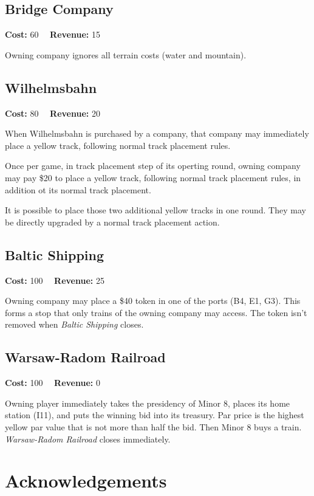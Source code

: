 \documentclass[10pt,a4paper,twocolumn]{article}
\begin{document}
\subsection{Bridge Company}

\textbf{Cost:} 60 ~~\textbf{Revenue:} 15

Owning company ignores all terrain costs (water and mountain).

\subsection{Wilhelmsbahn}

\textbf{Cost:} 80 ~~\textbf{Revenue:} 20

When Wilhelmsbahn is purchased by a company, that company may immediately place a yellow track, following normal track placement rules.

Once per game, in track placement step of its operting round, owning company may pay \$20 to place a yellow track, following normal track placement rules, in addition ot its normal track placement. 

It is possible to place those two additional yellow tracks in one round. They may be directly upgraded by a normal track placement action.

\subsection{Baltic Shipping}

\textbf{Cost:} 100 ~~\textbf{Revenue:} 25

Owning company may place a \$40 token in one of the ports (B4, E1, G3). This forms a stop that only trains of the owning company may access. The token isn't removed when \textit{Baltic Shipping} closes.

\subsection{Warsaw-Radom Railroad}

\textbf{Cost:} 100 ~~\textbf{Revenue:} 0

Owning player immediately takes the presidency of Minor 8, places its home station (I11), and puts the winning bid into its treasury. Par price is the highest yellow par value that is not more than half the bid. Then Minor 8 buys a train. \textit{Warsaw-Radom Railroad} closes immediately.

\section{Acknowledgements}
\end{document}
